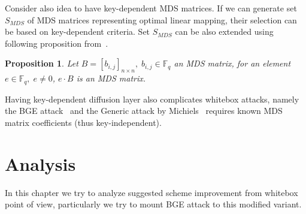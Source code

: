 \documentclass[11pt,oneside,final]{fithesis2}
\newtheorem{myprop}{Proposition}
\begin{document}
    \begin{figure}
    \begin{center}
    \leavevmode
    \centerline{}
    \end{center}
    \caption{}
    \label{fig:aes_mds}
    \end{figure}
    
    Consider also idea to have key-dependent MDS matrices. If we can generate set $S_{MDS}$ of MDS matrices representing optimal linear mapping, their selection 
    can be based on key-dependent criteria. Set $S_{MDS}$ can be also extended using following proposition from~\citep{journals/iacr/MalikN11}.

    \begin{myprop}
	Let $B = \left[b_{i,j} \right]_{n \times n},\; b_{i,j} \in \mathbb{F}_q$ an MDS matrix, for an element $e \in \mathbb{F}_q, \; e \neq 0$, $e \cdot B$ is an MDS matrix.
    \end{myprop}
    
    Having key-dependent diffusion layer also complicates whitebox attacks, namely the BGE attack~\citep{Billet:2004:CWB:2080787.2080809} and 
    the Generic attack by Michiels~\citep{Michiels:2007:MST:1314276.1314291} requires known MDS matrix coefficients (thus key-independent).    
    
    \section{Analysis}\label{sec:improvement_analysis}
    In this chapter we try to analyze suggested scheme improvement from whitebox point of view, particularly we try to mount BGE attack to this modified variant. 
\end{document}
